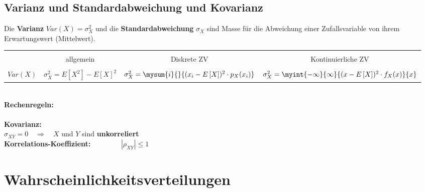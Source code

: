 		\subsection{Varianz und Standardabweichung und Kovarianz}
			Die \textbf{Varianz} $Var(X)=\sigma_X^2$ und die \textbf{Standardabweichung} $\sigma_X$ sind Masse für die Abweichung einer Zufallsvariable von ihrem Erwartungswert (Mittelwert).\\[0.2cm]
			\begin{tabular}{|l||c|c|c|}
			\hline&&&\\[-0.35cm]
				& allgemein & Diskrete ZV & Kontinuierliche ZV\\[0.1cm]
			\hline&&&\\[-0.4cm]
				$Var(X)$ & $\sigma_X^2 = E\left[X^2\right]-E\left[X\right]^2$ & $\sigma_X^2 = \mysum{i}{}{(x_i-E\left[X\right])^2\cdot p_X(x_i)}$ & $\sigma_X^2 = \myint{-\infty}{\infty}{(x-E\left[X\right])^2\cdot f_X(x)}{x}$\\[0.35cm]
			\hline
			\end{tabular}\\[0.3cm]
			\textbf{Rechenregeln:}\\[0.2cm]
			\\[0.3cm]
			\textbf{Kovarianz:} $\qquad$\\[0.2cm]
			$\sigma_{XY} = 0 \quad\Rightarrow\quad X$ und $Y$ sind \textbf{unkorreliert}\\[0.3cm]
			\textbf{Korrelations-Koeffizient:} $\qquad$$\qquad |\rho_{XY}|\leq 1$\\[0.2cm]
			

\newpage
	\section{Wahrscheinlichkeitsverteilungen}
